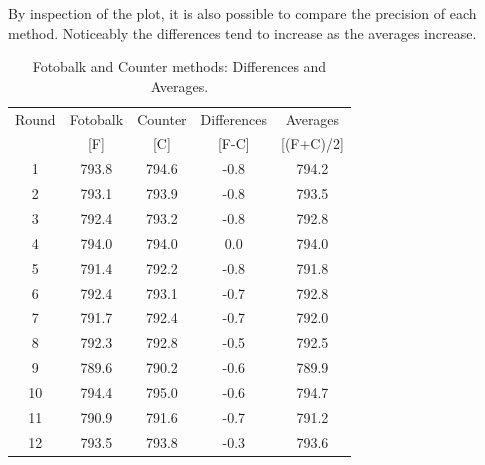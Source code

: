 \documentclass[12pt, a4paper]{report}
\theoremstyle{plain}
\theoremstyle{definition}
\theoremstyle{remark}
\begin{document}
	

By inspection of the plot, it is also possible to compare the precision of each method. Noticeably the differences tend to increase as the averages increase.
		
	
	\begin{table}[h!]
		\renewcommand\arraystretch{0.7}%
		\begin{center}
			\begin{tabular}{|c||c|c||c|c|}
				\hline
				Round & Fotobalk  & Counter  & Differences  & Averages  \\
				&  [F] & [C] & [F-C] &  [(F+C)/2] \\
				\hline
				1 & 793.8 & 794.6 & -0.8 & 794.2 \\
				2 & 793.1 & 793.9 & -0.8 & 793.5 \\
				3 & 792.4 & 793.2 & -0.8 & 792.8 \\
				4 & 794.0 & 794.0 & 0.0 & 794.0 \\
				5 & 791.4 & 792.2 & -0.8 & 791.8 \\
				6 & 792.4 & 793.1 & -0.7 & 792.8 \\
				7 & 791.7 & 792.4 & -0.7 & 792.0 \\
				8 & 792.3 & 792.8 & -0.5 & 792.5 \\
				9 & 789.6 & 790.2 & -0.6 & 789.9 \\
				10 & 794.4 & 795.0 & -0.6 & 794.7 \\
				11 & 790.9 & 791.6 & -0.7 & 791.2 \\
				12 & 793.5 & 793.8 & -0.3 & 793.6 \\
				\hline
			\end{tabular}
			\caption{Fotobalk and Counter methods: Differences and Averages.}
		\label{GrubbsData1}
		\end{center}
	\end{table}
	
\end{document}
